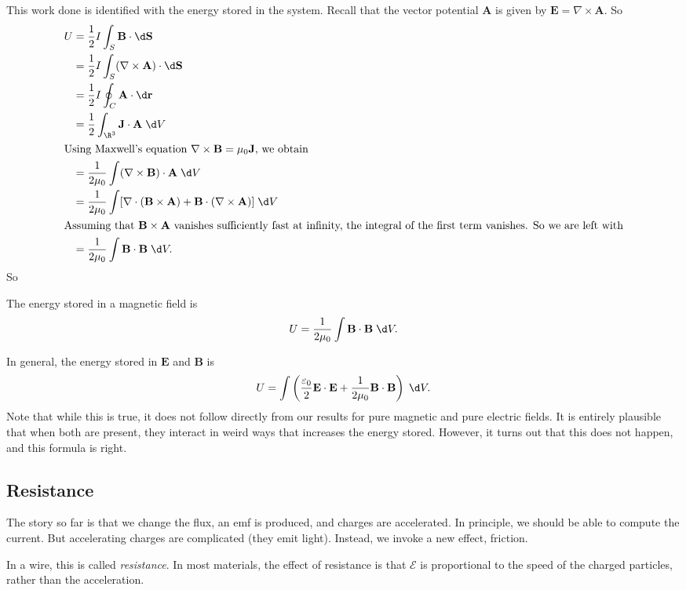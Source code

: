 \documentclass[a4paper]{article}
\begin{document}
This work done is identified with the energy stored in the system. Recall that the vector potential $\mathbf{A}$ is given by $\mathbf{E} = \nabla \times \mathbf{A}$. So
\begin{align*}
  U &= \frac{1}{2}I\int_S \mathbf{B}\cdot \d \mathbf{S}\\
  &= \frac{1}{2}I\int_S(\nabla\times \mathbf{A})\cdot \d \mathbf{S}\\
  &= \frac{1}{2}I\oint_C \mathbf{A}\cdot \d \mathbf{r}\\
  &= \frac{1}{2}\int_{\R^3} \mathbf{J}\cdot \mathbf{A}\;\d V\\
  \intertext{Using Maxwell's equation $\nabla\times \mathbf{B} = \mu_0 \mathbf{J}$, we obtain}
  &= \frac{1}{2\mu_0}\int (\nabla\times \mathbf{B})\cdot \mathbf{A}\;\d V\\
  &= \frac{1}{2\mu_0}\int[\nabla\cdot(\mathbf{B}\times \mathbf{A}) + \mathbf{B}\cdot (\nabla\times \mathbf{A})]\;\d V\\
  \intertext{Assuming that $\mathbf{B}\times \mathbf{A}$ vanishes sufficiently fast at infinity, the integral of the first term vanishes. So we are left with}
  &= \frac{1}{2\mu_0}\int \mathbf{B}\cdot \mathbf{B}\;\d V.
\end{align*}
So
\begin{prop}
  The energy stored in a magnetic field is
  \[
    U = \frac{1}{2\mu_0}\int \mathbf{B}\cdot \mathbf{B}\;\d V.
  \]
\end{prop}
In general, the energy stored in $\mathbf{E}$ and $\mathbf{B}$ is
\[
  U = \int \left(\frac{\varepsilon_0}{2}\mathbf{E}\cdot \mathbf{E} + \frac{1}{2\mu_0}\mathbf{B}\cdot \mathbf{B}\right)\;\d V.
\]
Note that while this is true, it does not follow directly from our results for pure magnetic and pure electric fields. It is entirely plausible that when both are present, they interact in weird ways that increases the energy stored. However, it turns out that this does not happen, and this formula is right.

\subsection{Resistance}
The story so far is that we change the flux, an emf is produced, and charges are accelerated. In principle, we should be able to compute the current. But accelerating charges are complicated (they emit light). Instead, we invoke a new effect, friction.

In a wire, this is called \emph{resistance}. In most materials, the effect of resistance is that $\mathcal{E}$ is proportional to the speed of the charged particles, rather than the acceleration.
\end{document}
